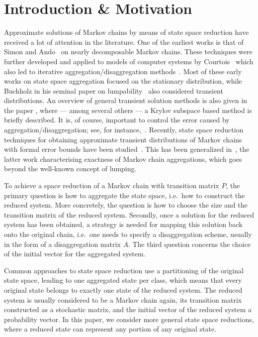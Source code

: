 \documentclass[runningheads]{llncs}
\begin{document}
\section{Introduction \& Motivation}\label{sec:intro}
Approximate solutions of Markov chains by means of state space reduction have received a lot of attention in the literature.
One of the earliest works is that of Simon and Ando~\cite{simonando1961aggregation} on nearly decomposable Markov chains.
These techniques were further developed and applied to models of computer systems by Courtois~\cite{courtois1977decomposability} which also led to iterative aggregation/disaggregation methods~\cite{koury1984iterativencd}.
Most of these early works on state space aggregation focused on the stationary distribution, while Buchholz in his seminal paper on lumpability~\cite{buchholz1994lumpability} also considered transient distributions.
An overview of general transient solution methods is also given in the paper \cite{deSouzaeSilva2000transientmc}, where --- among several others --- a Krylov subspace based method is briefly described.
It is, of course, important to control the error caused by aggregation/disaggregation; see, for instance,~\cite{bucholz2014aggregation}.
Recently, state space reduction techniques for obtaining approximate transient distributions of Markov chains with formal error bounds have been studied~\cite{abate2021aggregation}.
This has been generalized in~\cite{michel2025formalbounds}, the latter work characterising exactness of Markov chain aggregations, which goes beyond the well-known concept of lumping.

To achieve a space reduction of a Markov chain with transition matrix $P$, the primary question is how to aggregate the state space, i.e.\ how to construct the reduced system.
More concretely, the question is how to choose the size and the transition matrix of the reduced system.
Secondly, once a solution for the reduced system has been obtained,
a strategy is needed for mapping this solution back onto the original chain, i.e.\ one needs to specify a disaggregation scheme, usually in the form of a disaggregation matrix $A$.
The third question concerns the choice of the initial vector for the aggregated system.

Common approaches to state space reduction use a partitioning of the original state space, leading to one aggregated state per class, which means that every original state belongs to exactly one state of the reduced system.
The reduced system is usually considered to be a Markov chain again, its transition matrix constructed as a stochastic matrix, and the initial vector of the reduced system a probability vector.
In this paper, we consider more general state space reductions, where a reduced state can represent any portion of any original state.
\end{document}
